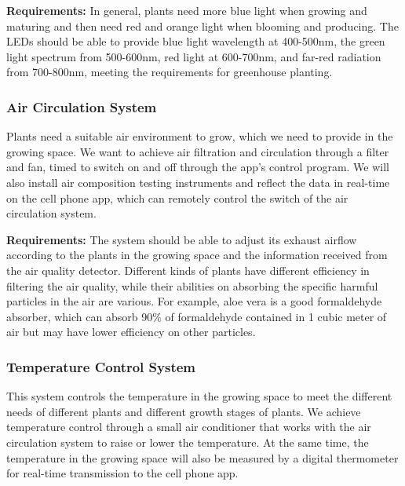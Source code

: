 \textbf{Requirements:}
In general, plants need more blue light when growing and maturing and then need red and orange light when blooming and producing.\cite{vercelletto_2021} The LEDs should be able to provide blue light wavelength at 400-500nm, the green light spectrum from 500-600nm, red light at 600-700nm, and far-red radiation from 700-800nm, meeting the requirements for greenhouse planting.\cite{technologies_2021}


\subsubsection{Air Circulation System}
Plants need a suitable air environment to grow, which we need to provide in the growing space. We want to achieve air filtration and circulation through a filter and fan, timed to switch on and off through the app's control program. We will also install air composition testing instruments and reflect the data in real-time on the cell phone app, which can remotely control the switch of the air circulation system.

\textbf{Requirements:}
The system should be able to adjust its exhaust airflow according to the plants in the growing space and the information received from the air quality detector. Different kinds of plants have different efficiency in filtering the air quality, while their abilities on absorbing the specific harmful particles in the air are various. For example, aloe vera is a good formaldehyde absorber, which can absorb 90\% of formaldehyde contained in 1 cubic meter of air but may have lower efficiency on other particles. 


\subsubsection{Temperature Control System}
This system controls the temperature in the growing space to meet the different needs of different plants and different growth stages of plants. We achieve temperature control through a small air conditioner that works with the air circulation system to raise or lower the temperature. At the same time, the temperature in the growing space will also be measured by a digital thermometer for real-time transmission to the cell phone app.

